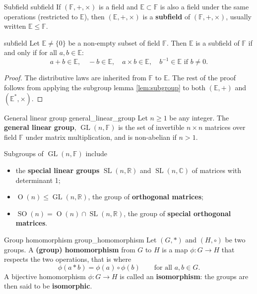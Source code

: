 \begin{definition}{Subfield \cite{math2601_notes}}{subfield}
If $(\mathbb{F}, +, \times)$ is a field and $\mathbb{E} \subset \mathbb{F}$ is also a field under the same operations (restricted to $\mathbb{E}$), then $(\mathbb{E}, +, \times)$ is a \textbf{subfield} of $(\mathbb{F}, +, \times)$, usually written $\mathbb{E} \leq \mathbb{F}$.
\end{definition}

\begin{lemma}{\cite{math2601_notes}}{subfield}
Let $\mathbb{E} \not = \{0\}$ be a non-empty subset of field $\mathbb{F}$. Then $\mathbb{E}$ is a subfield of $\mathbb{F}$ if and only if for all $a, b \in \mathbb{E}$:
$$ a + b \in \mathbb{E}, \quad -b \in \mathbb{E}, \quad a \times b \in \mathbb{E}, \quad b^{-1} \in \mathbb{E} \text{ if } b \not = 0 . $$

\begin{proof}
The distributive laws are inherited from $\mathbb{F}$ to $\mathbb{E}$. The rest of the proof follows from applying the subgroup lemma \ref{lem:subgroup} to both $(\mathbb{E}, +)$ and $(\mathbb{E}^*, \times)$.
\end{proof}
\end{lemma}

\begin{definition}{General linear group \cite{math2601_notes}}{general_linear_group}
Let $n \geq 1$ be any integer. The \textbf{general linear group}, $\operatorname{GL}(n, \mathbb{F})$ is the set of invertible $n \times n$ matrices over field $\mathbb{F}$ under matrix multiplication, and is non-abelian if $n > 1$.
\end{definition}

Subgroups of $\operatorname{GL}(n, \mathbb{F})$ include
\begin{itemize}
	\item the \textbf{special linear groups} $\operatorname{SL}(n, \mathbb{R})$ and $\operatorname{SL}(n, \mathbb{C})$ of matrices with determinant 1;
	\item $\operatorname{O}(n) \leq \operatorname{GL}(n, \mathbb{R})$, the group of \textbf{orthogonal matrices};
	\item $\operatorname{SO}(n) = \operatorname{O}(n) \cap \operatorname{SL}(n, \mathbb{R})$, the group of \textbf{special orthogonal matrices}.
\end{itemize}

\begin{definition}{Group homomorphism \cite{math2601_notes}}{group_homomorphism}
Let $(G, *)$ and $(H, \circ)$ be two groups. A \textbf{(group) homomorphism} from $G$ to $H$ is a map $\phi : G \to H$ that respects the two operations, that is where
$$ \phi (a * b) = \phi (a) \circ \phi (b) \qquad \text{for all } a, b \in G . $$
A bijective homomorphism $\phi : G \to H$ is called an \textbf{isomorphism}: the groups are then said to be \textbf{isomorphic}.
\end{definition}

